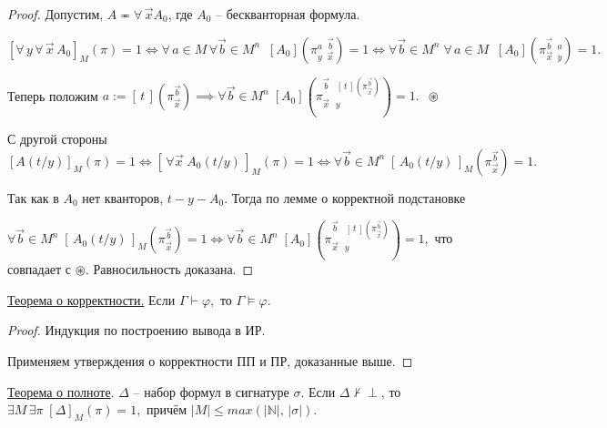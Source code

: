 \documentclass[a4paper, fleqn]{article}
\begin{document}
    \begin{proof}
    Допустим, $A \eqcirc \forall \, \overrightarrow{x} A_0$, где $A_0$ -- бескванторная формула.

    $[\forall \, y \, \forall \, \overrightarrow{x} \, A_0 ]_M (\pi) = 1 \iff \forall \, a \in M \, \forall  \overrightarrow{b} \in M^n \;  \; [A_0] \left(\pi^{a \; \; \overrightarrow{b}}_{y \; \; \overrightarrow{x}} \right) = 1 \iff \forall  \overrightarrow{b} \in M^n \;   \forall \, a \in M  \;  \; [A_0] \left(\pi^{\overrightarrow{b} \; \; a}_{\overrightarrow{x} \; \; y} \right) = 1.$

    Теперь положим $a := [ \, t \,]  \left(\pi_{\overrightarrow{x}}^{\overrightarrow{b}} \right) \implies \forall \overrightarrow{b} \in M^n \; [A_0] \left( \pi_{\overrightarrow{x} \; \; \, y}^{\overrightarrow{b} \; \; \; [ \, t \,]  \left(\pi_{\overrightarrow{x}}^{\overrightarrow{b}} \right)} \right) = 1. \; \; \circledast$

    С другой стороны $[A(t/y)]_M(\pi) = 1 \iff [ \, \forall \overrightarrow{x} \; A_0 (t/y) \,  ]_M (\pi) = 1 \iff \forall \overrightarrow{b} \in M^n \; [ \, A_0(t/y) \, ]_M \left(\pi_{\overrightarrow{x}}^{\overrightarrow{b}} \right) = 1.$

    Так как в $A_0$  нет кванторов, $t-y-A_0.$ Тогда по лемме о корректной подстановке

    $\forall \overrightarrow{b} \in M^n \; [ \, A_0(t/y) \, ]_M \left(\pi_{\overrightarrow{x}}^{\overrightarrow{b}} \right) = 1 \iff \forall \overrightarrow{b} \in M^n \; [A_0] \left( \pi_{\overrightarrow{x} \; \; \, y}^{\overrightarrow{b} \; \; \; [ \, t \,]  \left(\pi_{\overrightarrow{x}}^{\overrightarrow{b}} \right)} \right) = 1,$ что совпадает с  $\circledast.$ Равносильность доказана.

    \end{proof}

    \underline{Теорема о корректности.} Если $\Gamma \vdash \varphi,$ то $\Gamma \vDash \varphi.$

    \begin{proof} Индукция по построению вывода в ИР.

    Применяем утверждения о корректности ПП и ПР, доказанные выше.
    \end{proof}

    \underline{Теорема о полноте}. $\Delta$ -- набор формул в сигнатуре $\sigma$. Если $\Delta \nvdash \perp$, то $\exists M \, \exists \pi \; [\Delta]_M (\pi) = 1,$ причём $|M| \leq max(|\mathbb{N}|, \, | \sigma|). $
\end{document}
